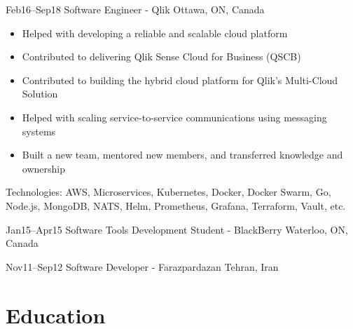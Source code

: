 \documentclass[]{cv-style}                     %
\begin{document}
\begin{entrylist}
  \entry
  {\small Feb16--Sep18}
  {Software Engineer - Qlik}
  {Ottawa, ON, Canada}
  {
    \begin{itemize}
      \item Helped with developing a reliable and scalable cloud platform
      \item Contributed to delivering Qlik Sense Cloud for Business (QSCB)
      \item Contributed to building the hybrid cloud platform for Qlik's Multi-Cloud Solution
      \item Helped with scaling service-to-service communications using messaging systems
      \item Built a new team, mentored new members, and transferred knowledge and ownership
    \end{itemize}
    Technologies: AWS, Microservices, Kubernetes, Docker, Docker Swarm, Go, Node.js, MongoDB, NATS, Helm, Prometheus, Grafana, Terraform, Vault, etc.
   }

  \entry
  {\small Jan15--Apr15}
  {Software Tools Development Student - BlackBerry}
  {Waterloo, ON, Canada}
  {}

  \entry
  {\small Nov11--Sep12}
  {Software Developer - Farazpardazan}
  {Tehran, Iran}
  {}


\end{entrylist}



\newpage
\section{Education}
\end{document}
